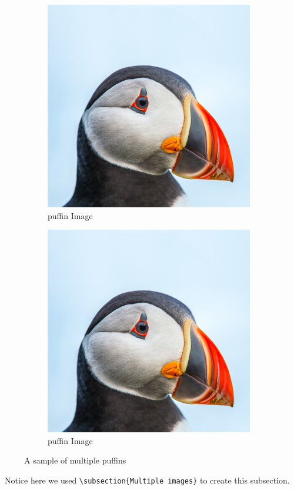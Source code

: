 \begin{figure} [H]
    \begin{subfigure}[b]{.45\linewidth}
        \includegraphics[width=\linewidth]{puffin}
        \caption{puffin Image}\label{fig:puffin6}
    \end{subfigure}
    \begin{subfigure}[b]{.45\linewidth}
        \includegraphics[width=\linewidth]{puffin}
        \caption{puffin Image}\label{fig:puffin7}
    \end{subfigure}
    \caption{A sample of multiple puffins}
    \label{fig:puffinall}
\end{figure}
\faWarning\, Notice here we used \verb=\subsection{Multiple images}= to create this subsection.
